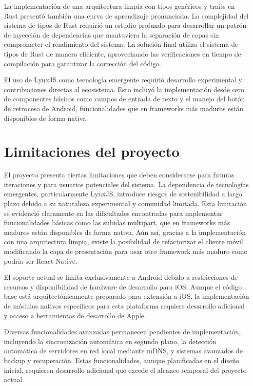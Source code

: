 La implementación de una arquitectura limpia con tipos genéricos y traits en Rust presentó también una curva de aprendizaje pronunciada. La complejidad del sistema de tipos de Rust requirió un estudio profundo para desarrollar un patrón de inyección de dependencias que mantuviera la separación de capas sin comprometer el rendimiento del sistema. La solución final utiliza el sistema de tipos de Rust de manera eficiente, aprovechando las verificaciones en tiempo de compilación para garantizar la corrección del código.

El uso de LynxJS como tecnología emergente requirió desarrollo experimental y contribuciones directas al ecosistema. Esto incluyó la implementación desde cero de componentes básicos como campos de entrada de texto y el manejo del botón de retroceso de Android, funcionalidades que en frameworks más maduros están disponibles de forma nativa.

\section{Limitaciones del proyecto}

El proyecto presenta ciertas limitaciones que deben considerarse para futuras iteraciones y para usuarios potenciales del sistema. La dependencia de tecnologías emergentes, particularmente LynxJS, introduce riesgos de sostenibilidad a largo plazo debido a su naturaleza experimental y comunidad limitada. Esta limitación se evidenció claramente en las dificultades encontradas para implementar funcionalidades básicas como las subidas multipart, que en frameworks más maduros están disponibles de forma nativa. Aún así, gracias a la implementación con una arquitectura limpia, existe la posibilidad de refactorizar el cliente móvil modificando la capa de presentación para usar otro framework más maduro como podría ser React Native.

El soporte actual se limita exclusivamente a Android debido a restricciones de recursos y disponibilidad de hardware de desarrollo para iOS. Aunque el código base está arquitectónicamente preparado para extensión a iOS, la implementación de módulos nativos específicos para esta plataforma requiere desarrollo adicional y acceso a herramientas de desarrollo de Apple.

Diversas funcionalidades avanzadas permanecen pendientes de implementación, incluyendo la sincronización automática en segundo plano, la detección automática de servidores en red local mediante mDNS, y sistemas avanzados de backup y recuperación. Estas funcionalidades, aunque planificadas en el diseño inicial, requieren desarrollo adicional que excede el alcance temporal del proyecto actual.

